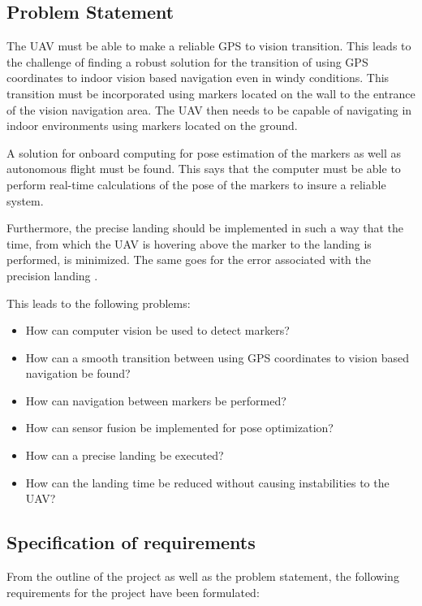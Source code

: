 \documentclass[../Head/report.tex]{subfiles}
\begin{document}
\newpage
\subsection{Problem Statement}

The UAV must be able to make a reliable GPS to vision transition. This leads to the challenge of finding a robust solution for the transition of using GPS coordinates to indoor vision based navigation even in windy conditions. This transition must be incorporated using markers located on the wall to the entrance of the vision navigation area. The UAV then needs to be capable of navigating in indoor environments using markers located on the ground.    

A solution for onboard computing for pose estimation of the markers as well as autonomous flight must be found. This says that the computer must be able to perform real-time calculations of the pose of the markers to insure a reliable system. 

Furthermore, the precise landing should be implemented in such a way that the time, from which the UAV is hovering above the marker to the landing is performed, is minimized. The same goes for the error associated with the precision landing .  

This leads to the following problems:

\begin{itemize}
    \item How can computer vision be used to detect markers?
    \item How can a smooth transition between using GPS coordinates to vision based navigation be found?
    \item How can navigation between markers be performed?
    \item How can sensor fusion be implemented for pose optimization?
    \item How can a precise landing be executed?
    \item How can the landing time be reduced without causing instabilities to the UAV?
    
\end{itemize} 

\subsection{Specification of requirements}

From the outline of the project as well as the problem statement, the following requirements for the project have been formulated:
\end{document}
